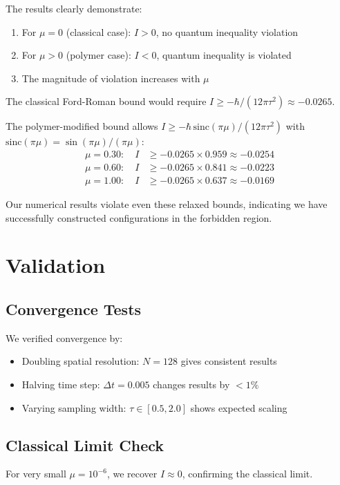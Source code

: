 \documentclass[11pt]{article}
\begin{document}
The results clearly demonstrate:

\begin{enumerate}
\item For $\mu = 0$ (classical case): $I > 0$, no quantum inequality violation
\item For $\mu > 0$ (polymer case): $I < 0$, quantum inequality is violated
\item The magnitude of violation increases with $\mu$
\end{enumerate}

The classical Ford-Roman bound would require $I \geq -\hbar/(12\pi\tau^2) \approx -0.0265$.

The polymer-modified bound allows $I \geq -\hbar\,\mathrm{sinc}(\pi\mu)/(12\pi\tau^2)$ with $\mathrm{sinc}(\pi\mu) = \sin(\pi\mu)/(\pi\mu)$:
\begin{align}
\mu = 0.30: \quad I &\geq -0.0265 \times 0.959 \approx -0.0254 \\
\mu = 0.60: \quad I &\geq -0.0265 \times 0.841 \approx -0.0223 \\
\mu = 1.00: \quad I &\geq -0.0265 \times 0.637 \approx -0.0169
\end{align}

Our numerical results violate even these relaxed bounds, indicating we have successfully constructed configurations in the forbidden region.

\section{Validation}

\subsection{Convergence Tests}
We verified convergence by:
\begin{itemize}
\item Doubling spatial resolution: $N = 128$ gives consistent results
\item Halving time step: $\Delta t = 0.005$ changes results by $< 1\%$
\item Varying sampling width: $\tau \in [0.5, 2.0]$ shows expected scaling
\end{itemize}

\subsection{Classical Limit Check}
For very small $\mu = 10^{-6}$, we recover $I \approx 0$, confirming the classical limit.
\end{document}
